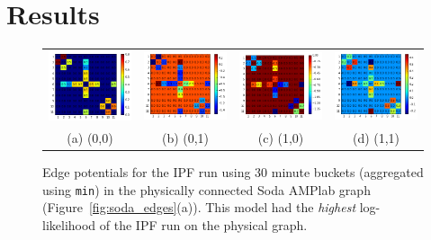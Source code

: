 \section{Results}

\begin{figure}[ht]
\centering
\begin{tabular}{cccc}
\includegraphics[width=1.3in]{figs/30minmin00conf} & \includegraphics[width=1.3in]{figs/30minmin01conf} & \includegraphics[width=1.3in]{figs/30minmin10conf} & \includegraphics[width=1.3in]{figs/30minmin11conf} \\
(a) (0,0) & (b) (0,1) & (c) (1,0) & (d) (1,1) \\[6pt]
\end{tabular}
\caption{Edge potentials for the IPF run using 30 minute buckets (aggregated using \texttt{min}) in the physically connected Soda AMPlab graph (Figure~\ref{fig:soda_edges}(a)). This model had the \emph{highest} log-likelihood of the IPF run on the physical graph.}
\label{fig:30minminphysical}
\end{figure}

